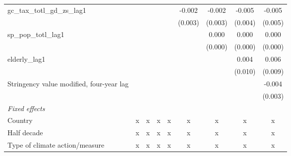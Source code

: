 \begin{tabular}{lcccccccc}
   gc\_tax\_totl\_gd\_zs\_lag1                                                &              &              &              &              & -0.002       & -0.002       & -0.005      & -0.005\\   
                                                                              &              &              &              &              & (0.003)      & (0.003)      & (0.004)     & (0.005)\\   
   sp\_pop\_totl\_lag1                                                        &              &              &              &              &              & 0.000        & 0.000       & 0.000\\   
                                                                              &              &              &              &              &              & (0.000)      & (0.000)     & (0.000)\\   
   elderly\_lag1                                                              &              &              &              &              &              &              & 0.004       & 0.006\\   
                                                                              &              &              &              &              &              &              & (0.010)     & (0.009)\\   
   Stringency value modified, four-year lag                                   &              &              &              &              &              &              &             & -0.004\\   
                                                                              &              &              &              &              &              &              &             & (0.003)\\   
   \emph{Fixed effects}\\
   Country                                                                    & x            & x            & x            & x            & x            & x            & x           & x\\  
   Half decade                                                                & x            & x            & x            & x            & x            & x            & x           & x\\  
   Type of climate action/measure                                             & x            & x            & x            & x            & x            & x            & x           & x\\  

\end{tabular}
